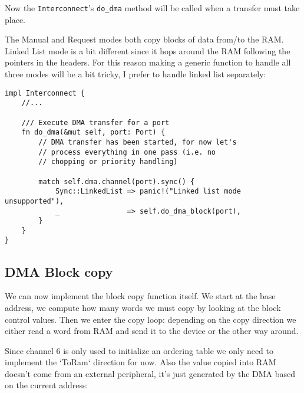 \documentclass[a4paper]{article}
\newcommand{\code}[1] {\texttt{#1}}
\begin{document}
Now the \code{Interconnect}'s \code{do\_dma} method will be called
when a transfer must take place.

The Manual and Request modes both copy blocks of data from/to the
RAM. Linked List mode is a bit different since it hops around the RAM
following the pointers in the headers. For this reason making a
generic function to handle all three modes will be a bit tricky, I
prefer to handle linked list separately:

\begin{lstlisting}
impl Interconnect {
    //...

    /// Execute DMA transfer for a port
    fn do_dma(&mut self, port: Port) {
        // DMA transfer has been started, for now let's
        // process everything in one pass (i.e. no
        // chopping or priority handling)

        match self.dma.channel(port).sync() {
            Sync::LinkedList => panic!("Linked list mode unsupported"),
            _                => self.do_dma_block(port),
        }
    }
}
\end{lstlisting}

\subsection{DMA Block copy}

We can now implement the block copy function itself. We start at the
base address, we compute how many words we must copy by looking at the
block control values. Then we enter the copy loop: depending on the
copy direction we either read a word from RAM and send it to the
device or the other way around.

Since channel 6 is only used to initialize an ordering table we only
need to implement the `ToRam` direction for now. Also the value copied
into RAM doesn't come from an external peripheral, it's just generated
by the DMA based on the current address:
\end{document}
